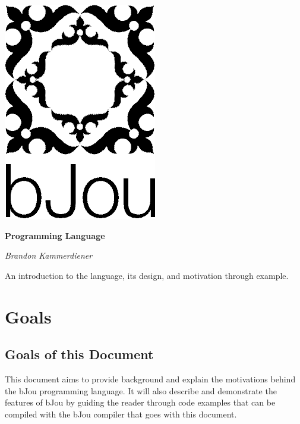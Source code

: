 \documentclass[12pt]{article}
\begin{document}
\begin{titlepage}
	\centering

	\includegraphics[scale=0.5]{black.PNG}

	\vspace{1cm}

	{\huge\bfseries Programming Language}

	\vspace{4.8cm}

	{\itshape\Large Brandon Kammerdiener}

	\vfill

	{\large An introduction to the language, its design, and motivation through example. }

\end{titlepage}

\newpage

\tableofcontents

\newpage

\section*{Goals}

	\subsection*{Goals of this Document}
		This document aims to provide background and explain the motivations behind the bJou programming language. It will also describe and demonstrate the features of bJou by guiding the reader through code examples that can be compiled with the bJou compiler that goes with this document.	
	
\end{document}
